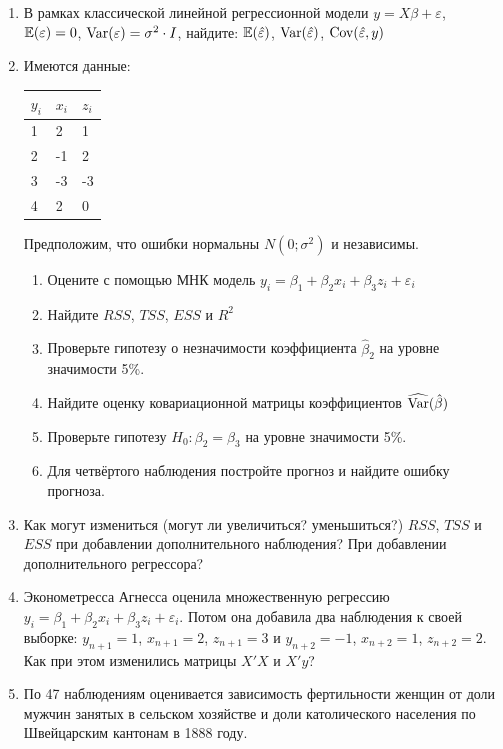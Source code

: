 \documentclass[12pt, a4paper]{article}\usepackage[]{graphicx}\usepackage[]{color}
\begin{document}
\begin{enumerate}

\item В рамках классической линейной регрессионной модели $y=X\beta+ \varepsilon$, $\mathbb{E}(\varepsilon)=0$, $\operatorname{Var}(\varepsilon)=\sigma^2 \cdot I$, найдите: $\mathbb{E}(\hat\varepsilon)$, $\operatorname{Var}(\hat\varepsilon)$, $\operatorname{Cov}(\hat\varepsilon, y)$

\item Имеются данные:

\begin{tabular}{lll}
\toprule
$y_i$ & $x_i$ & $z_i$ \\
\midrule
1 & 2 & 1 \\
2 & -1 & 2 \\
3 & -3 & -3 \\
4 & 2 & 0 \\
\bottomrule
\end{tabular}

Предположим, что ошибки нормальны $N(0;\sigma^2)$ и независимы.

\begin{enumerate}
\item Оцените с помощью МНК модель $y_i=\beta_1 + \beta_2 x_i + \beta_3 z_i + \varepsilon_i$
\item Найдите $RSS$, $TSS$, $ESS$ и $R^2$
\item Проверьте гипотезу о незначимости коэффициента $\hat\beta_2$ на уровне значимости 5\%.
\item Найдите оценку ковариационной матрицы коэффициентов $\widehat{\operatorname{Var}}(\hat\beta)$
\item Проверьте гипотезу $H_0: \beta_2 = \beta_3$ на уровне значимости 5\%.
\item Для четвёртого наблюдения постройте прогноз и найдите ошибку прогноза.
\end{enumerate}

\item Как могут измениться (могут ли увеличиться? уменьшиться?) $RSS$, $TSS$ и $ESS$ при добавлении дополнительного наблюдения? При добавлении дополнительного регрессора?

\item Эконометресса Агнесса оценила множественную регрессию $y_i = \beta_1 + \beta_2 x_i + \beta_3 z_i + \varepsilon_i$. Потом она добавила два наблюдения к своей выборке: $y_{n+1}=1$, $x_{n+1}=2$, $z_{n+1}=3$ и $y_{n+2}=-1$, $x_{n+2}=1$, $z_{n+2}=2$. Как при этом изменились матрицы $X'X$ и $X'y$?


\item По 47 наблюдениям оценивается зависимость фертильности женщин от доли мужчин занятых в сельском хозяйстве и доли католического населения по Швейцарским кантонам в 1888 году.


\end{enumerate}
\end{document}
